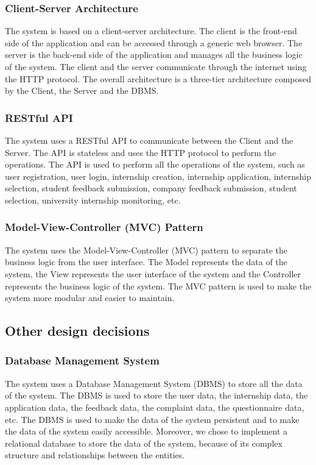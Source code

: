 \documentclass{article}
\begin{document}
\subsubsection{Client-Server Architecture}

The system is based on a client-server architecture. The client is the front-end side of the application and can be accessed through a generic web browser. The server is the back-end side of the application and manages all the business logic of the system. The client and the server communicate through the internet using the HTTP protocol. The overall architecture is a three-tier architecture composed by the Client, the Server and the DBMS.

\subsubsection{RESTful API}

The system uses a RESTful API to communicate between the Client and the Server. The API is stateless and uses the HTTP protocol to perform the operations. The API is used to perform all the operations of the system, such as user registration, user login, internship creation, internship application, internship selection, student feedback submission, company feedback submission, student selection, university internship monitoring, etc.

\subsubsection{Model-View-Controller (MVC) Pattern}

The system uses the Model-View-Controller (MVC) pattern to separate the business logic from the user interface. The Model represents the data of the system, the View represents the user interface of the system and the Controller represents the business logic of the system. The MVC pattern is used to make the system more modular and easier to maintain.

\subsection{Other design decisions}

\subsubsection{Database Management System}

The system uses a Database Management System (DBMS) to store all the data of the system. The DBMS is used to store the user data, the internship data, the application data, the feedback data, the complaint data, the questionnaire data, etc. The DBMS is used to make the data of the system persistent and to make the data of the system easily accessible. Moreover, we chose to implement a relational database to store the data of the system, because of its complex structure and relationships between the entities.
\end{document}
